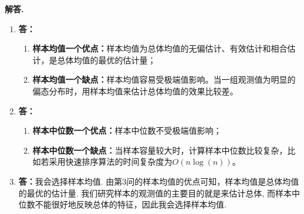 \documentclass[12pt, a4paper, oneside]{ctexart}
\newenvironment{solution}{\par\noindent\textbf{解答. }}{\par}
\begin{document}
\begin{solution}
\begin{enumerate}
   	\item {\tt }   {\bf 答：}
   	 \begin{enumerate}
   	 		\item {\tt }   {\bf 样本均值一个优点：}样本均值为总体均值的无偏估计、有效估计和相合估计，是总体均值的最优的估计量；
   	 		\item {\tt }   {\bf 样本均值一个缺点：}样本均值容易受极端值影响。当一组观测值为明显的偏态分布时，用样本均值来估计总体均值的效果比较差。
   	 \end{enumerate}
   	\item {\tt }   {\bf 答：}
   		 \begin{enumerate}
   		\item {\tt }   {\bf 样本中位数一个优点：}样本中位数不受极端值影响；
   		\item {\tt }   {\bf 样本中位数一个缺点：}当样本容量较大时，计算样本中位数比较复杂，比如若采用快速排序算法的时间复杂度为$ O(n\log(n)) $。
   		  \end{enumerate}
   	\item {\tt }   {\bf 答：}我会选择样本均值. 由第3问的样本均值的优点可知，样本均值是总体均值的最优的估计量. 我们研究样本的观测值的主要目的就是来估计总体, 而样本中位数不能很好地反映总体的特征，因此我会选择样本均值.
   \end{enumerate}
    
    
\end{solution}



  
  
  
\end{document}
